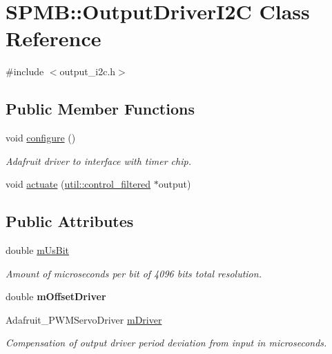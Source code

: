 \hypertarget{classSPMB_1_1OutputDriverI2C}{}\section{S\+P\+MB\+:\+:Output\+Driver\+I2C Class Reference}
\label{classSPMB_1_1OutputDriverI2C}


{\ttfamily \#include $<$output\+\_\+i2c.\+h$>$}

\subsection*{Public Member Functions}
\begin{DoxyCompactItemize}
\item 
void \hyperlink{classSPMB_1_1OutputDriverI2C_a65b12f0a0b98851d21ad863fd1584725}{configure} ()
\begin{DoxyCompactList}\small\item\em Adafruit driver to interface with timer chip. \end{DoxyCompactList}\item 
void \hyperlink{classSPMB_1_1OutputDriverI2C_a8b82addf2f9101b22cf8bfca160132cb}{actuate} (\hyperlink{structSPMB_1_1util_1_1control__filtered}{util\+::control\+\_\+filtered} $\ast$output)
\end{DoxyCompactItemize}
\subsection*{Public Attributes}
\begin{DoxyCompactItemize}
\item 
double \hyperlink{classSPMB_1_1OutputDriverI2C_a1dc1d614d4e099105b124656a871aa83}{m\+Us\+Bit}\hypertarget{classSPMB_1_1OutputDriverI2C_a1dc1d614d4e099105b124656a871aa83}{}\label{classSPMB_1_1OutputDriverI2C_a1dc1d614d4e099105b124656a871aa83}

\begin{DoxyCompactList}\small\item\em Amount of microseconds per bit of 4096 bits total resolution. \end{DoxyCompactList}\item 
double {\bfseries m\+Offset\+Driver}\hypertarget{classSPMB_1_1OutputDriverI2C_a8ab5bd3883d50cca560313b5275b81e5}{}\label{classSPMB_1_1OutputDriverI2C_a8ab5bd3883d50cca560313b5275b81e5}

\item 
Adafruit\+\_\+\+P\+W\+M\+Servo\+Driver \hyperlink{classSPMB_1_1OutputDriverI2C_aecd74104de6faf86afbc9c1f9cd0b50a}{m\+Driver}\hypertarget{classSPMB_1_1OutputDriverI2C_aecd74104de6faf86afbc9c1f9cd0b50a}{}\label{classSPMB_1_1OutputDriverI2C_aecd74104de6faf86afbc9c1f9cd0b50a}

\begin{DoxyCompactList}\small\item\em Compensation of output driver period deviation from input in microseconds. \end{DoxyCompactList}\end{DoxyCompactItemize}


